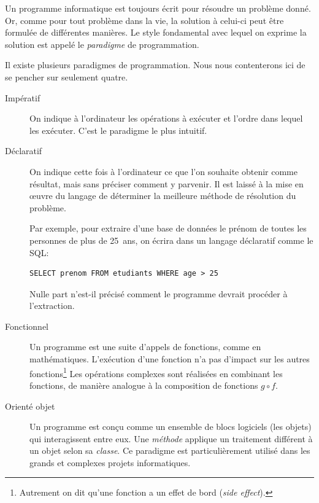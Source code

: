 Un programme informatique est toujours écrit pour résoudre un problème
donné. Or, comme pour tout problème dans la vie, la solution à
celui-ci peut être formulée de différentes manières. Le style
fondamental avec lequel on exprime la solution est appelé le
\emph{paradigme} de programmation.

Il existe plusieurs paradigmes de programmation. Nous nous
contenterons ici de se pencher sur seulement quatre.

\begin{description}
\item[Impératif]  On indique à l'ordinateur
  les opérations à exécuter et l'ordre dans lequel les exécuter. C'est
  le paradigme le plus intuitif.
\item[Déclaratif]  On indique cette fois à
  l'ordinateur ce que l'on souhaite obtenir comme résultat, mais sans
  préciser comment y parvenir. Il est laissé à la mise en œuvre du
  langage de déterminer la meilleure méthode de résolution du
  problème.

  Par exemple, pour extraire d'une base de données  le
  prénom de toutes les personnes de plus de 25~ans, on écrira dans un
  langage déclaratif comme le SQL:
\begin{Schunk}
\begin{Verbatim}
SELECT prenom FROM etudiants WHERE age > 25
\end{Verbatim}
\end{Schunk}
  Nulle part n'est-il précisé comment le programme devrait procéder à
  l'extraction.
\item[Fonctionnel]  Un programme est une
  suite d'appels de fonctions, comme en mathématiques. L'exécution
  d'une fonction n'a pas d'impact sur les autres fonctions\footnote{%
    Autrement on dit qu'une fonction a un effet de bord (\emph{side
      effect}).} %
  Les opérations complexes sont réalisées en combinant les fonctions,
  de manière analogue à la composition de fonctions $g \circ f$.
\item[Orienté objet]  Un programme est
  conçu comme un ensemble de blocs logiciels (les objets) qui
  interagissent entre eux. Une \emph{méthode} applique un traitement
  différent à un objet selon sa \emph{classe}. Ce paradigme est
  particulièrement utilisé dans les grands et complexes projets
  informatiques.
\end{description}

